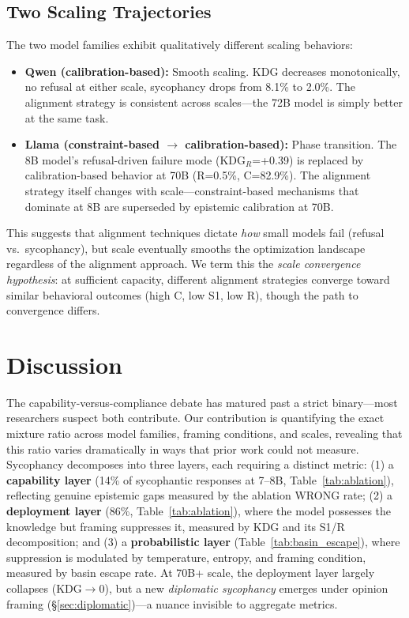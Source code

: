 \documentclass{article}
\begin{document}
\subsection{Two Scaling Trajectories}

The two model families exhibit qualitatively different scaling behaviors:

\begin{itemize}
    \item \textbf{Qwen (calibration-based):} Smooth scaling. KDG decreases monotonically, no refusal at either scale, sycophancy drops from 8.1\% to 2.0\%. The alignment strategy is consistent across scales---the 72B model is simply better at the same task.
    \item \textbf{Llama (constraint-based $\to$ calibration-based):} Phase transition. The 8B model's refusal-driven failure mode (KDG$_R$=+0.39) is replaced by calibration-based behavior at 70B (R=0.5\%, C=82.9\%). The alignment strategy itself changes with scale---constraint-based mechanisms that dominate at 8B are superseded by epistemic calibration at 70B.
\end{itemize}

This suggests that alignment techniques dictate \emph{how} small models fail (refusal vs.\ sycophancy), but scale eventually smooths the optimization landscape regardless of the alignment approach. We term this the \emph{scale convergence hypothesis}: at sufficient capacity, different alignment strategies converge toward similar behavioral outcomes (high C, low S1, low R), though the path to convergence differs.

\section{Discussion}
\label{sec:discussion}

The capability-versus-compliance debate has matured past a strict binary---most researchers suspect both contribute. Our contribution is quantifying the exact mixture ratio across model families, framing conditions, and scales, revealing that this ratio varies dramatically in ways that prior work could not measure. Sycophancy decomposes into three layers, each requiring a distinct metric: (1) a \textbf{capability layer} (14\% of sycophantic responses at 7--8B, Table~\ref{tab:ablation}), reflecting genuine epistemic gaps measured by the ablation WRONG rate; (2) a \textbf{deployment layer} (86\%, Table~\ref{tab:ablation}), where the model possesses the knowledge but framing suppresses it, measured by KDG and its S1/R decomposition; and (3) a \textbf{probabilistic layer} (Table~\ref{tab:basin_escape}), where suppression is modulated by temperature, entropy, and framing condition, measured by basin escape rate. At 70B+ scale, the deployment layer largely collapses (KDG$\to$0), but a new \emph{diplomatic sycophancy} emerges under opinion framing (\S\ref{sec:diplomatic})---a nuance invisible to aggregate metrics.
\end{document}
